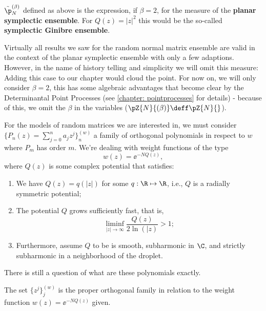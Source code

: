 \begin{definicao}
	$\tilde{\p}_N^{(\beta)}$ defined as above is the expression, if $\beta = 2$, for the measure of the \textbf{planar symplectic ensemble}. For $Q(z) = |z|^2$ this would be the so-called \textbf{symplectic Ginibre ensemble}. 
\end{definicao}

Virtually all results we saw for the random normal matrix ensemble are valid in the context of the planar symplectic ensemble with only a few adaptions. However, in the name of history telling and simplicity we will omit this measure: Adding this case to our chapter would cloud the point. For now on, we will only consider $\beta = 2$, this has some algebraic advantages that become clear by the Determinantal Point Processes (see \autoref{chapter: pointprocesses} for details) - because of this, we omit the $\beta$ in the variables ($\pZ{N}{(\beta)} \deff \pZ{N}{}$).

For the models of random matrices we are interested in, we must consider $\{P_n(z) = \sum_{j=0}^{n} a_j z^j\}_{n}^{(w)}$ a family of orthogonal polynomials in respect to $w$ where $P_m$ has order $m$. We're dealing with weight functions of the type
\begin{equation}
	w(z) = \ee^{-N Q(z)},
\end{equation} 
where $Q(z)$ is some complex potential that satisfies:

\begin{enumerate}
	\item We have $Q(z) = q(|z|)$ for some $q: \R \mapsto \R$, i.e., $Q$ is a radially symmetric potential;
	\item The potential $Q$ grows sufficiently fast, that is, 
	\begin{equation}
		\liminf_{|z| \rightarrow \infty} \frac{Q(z)}{2 \ln(|z)} > 1;
	\end{equation}
	\item Furthermore, assume $Q$ to be is smooth, subharmonic in $\C$, and strictly subharmonic in a neighborhood of the droplet.
\end{enumerate}
There is still a question of what are these polynomials exactly. 

\begin{lema}
	The set $\{z^j\}_j^{(w)}$ is the proper orthogonal family in relation to the weight function $w(z) = \ee^{-N Q(z)}$ given.
\end{lema}

